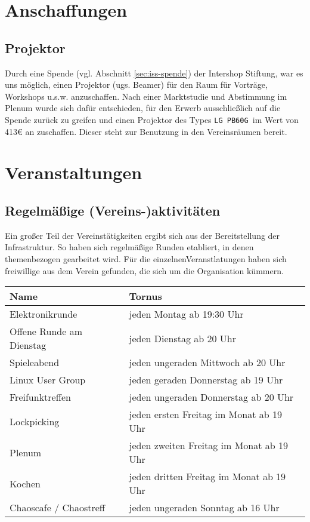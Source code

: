 \documentclass[10pt,DIV16]{scrartcl}
\begin{document}
\section{Anschaffungen}


\subsection{Projektor}
\label{sec:beamerkauf}

Durch eine Spende (vgl. Abschnitt \ref{sec:iss-spende}) der
Intershop Stiftung, war es uns möglich, einen Projektor (ugs. Beamer) für den Raum
für Vorträge, Workshops u.s.w. anzuschaffen. Nach einer Marktstudie
und Abstimmung im Plenum wurde sich dafür entschieden, für den
Erwerb ausschließlich auf die Spende zurück zu greifen und einen
Projektor des Types \texttt{LG PB60G }im Wert von 413\euro{} an
zuschaffen. Dieser steht zur Benutzung in den Vereinsräumen bereit.

\section{Veranstaltungen}

\subsection{Regelmäßige (Vereins-)aktivitäten}

Ein großer Teil der Vereinstätigkeiten ergibt sich aus der 
Bereitstellung der Infrastruktur. So haben sich regelmäßige Runden 
etabliert, in denen themenbezogen gearbeitet wird. Für die 
einzelnenVeranstlatungen haben sich freiwillige aus dem Verein 
gefunden, die sich um die Organisation kümmern.

\begin{table}[h]
	\begin{tabular}{l|l}
		Name   &  Tornus \\ \hline
		Elektronikrunde   &  jeden Montag ab 19:30 Uhr\\
		Offene Runde am Dienstag   &  jeden Dienstag ab 20 Uhr\\
		Spieleabend   &  jeden ungeraden Mittwoch ab 20 Uhr\\
		Linux User Group   &  jeden geraden Donnerstag ab 19 Uhr\\
		Freifunktreffen   &  jeden ungeraden Donnerstag ab 20 Uhr\\
		Lockpicking   &  jeden ersten Freitag im Monat ab 19 Uhr\\
		Plenum   &  jeden zweiten Freitag im Monat ab 19 Uhr\\
		Kochen   &  jeden dritten Freitag im Monat ab 19 Uhr\\
		Chaoscafe / Chaostreff   &  jeden ungeraden Sonntag ab 16 Uhr\\
\end{tabular}
\end{table}
\end{document}
